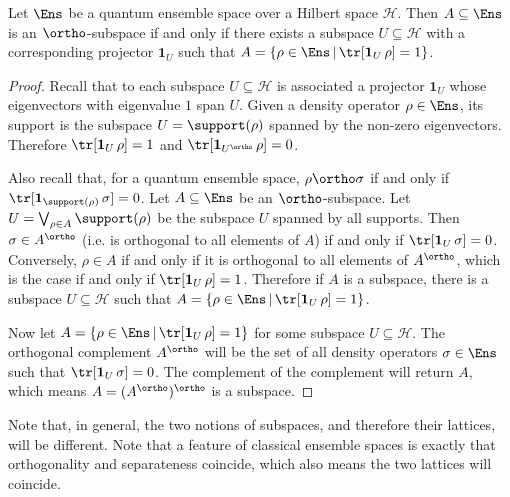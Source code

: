 \begin{mathSection}
\begin{prop}
	Let $\Ens$ be a quantum ensemble space over a Hilbert space $\mathcal{H}$. Then $A \subseteq \Ens$ is an $\ortho$-subspace if and only if there exists a subspace $U \subseteq \mathcal{H}$ with a corresponding projector $\mathbf{1}_{U}$ such that $A = \{ \rho \in \Ens \, | \, \tr[\mathbf{1}_{U} \, \rho] = 1\}$. 
\end{prop}

\begin{proof}
	Recall that to each subspace $U \subseteq \mathcal{H}$ is associated a projector $\mathbf{1}_U$ whose eigenvectors with eigenvalue $1$ span $U$. Given a density operator $\rho \in \Ens$, its support is the subspace $U=\support(\rho)$ spanned by the non-zero eigenvectors. Therefore $\tr[\mathbf{1}_{U} \, \rho] = 1$ and $\tr[\mathbf{1}_{U^{\ortho}} \, \rho] = 0$.

	Also recall that, for a quantum ensemble space, $\rho \ortho \sigma$ if and only if $\tr[ \mathbf{1}_{\support(\rho)} \, \sigma] = 0$. Let $A \subseteq \Ens$ be an $\ortho$-subspace. Let $U = \bigvee_{\rho \in A} \support(\rho)$ be the subspace $U$ spanned by all supports. Then $\sigma \in A^{\ortho}$  (i.e. is orthogonal to all elements of $A$) if and only if $\tr[\mathbf{1}_{U} \, \sigma] = 0$. Conversely, $\rho \in A$ if and only if it is orthogonal to all elements of $A^{\ortho}$, which is the case if and only if $\tr[\mathbf{1}_{U} \, \rho] = 1$. Therefore if $A$ is a subspace, there is a subspace $U \subseteq \mathcal{H}$ such that $A = \{ \rho \in \Ens \, | \, \tr[\mathbf{1}_{U} \, \rho] = 1\}$.
	
	Now let $A = \{ \rho \in \Ens \, | \, \tr[\mathbf{1}_{U} \, \rho] = 1\}$ for some subspace $U \subseteq \mathcal{H}$. The orthogonal complement $A^{\ortho}$ will be the set of all density operators $\sigma \in \Ens$ such that $\tr[\mathbf{1}_{U} \, \sigma] = 0$. The complement of the complement will return $A$, which means $A = (A^{\ortho})^{\ortho}$ is a subspace.
\end{proof}
\end{mathSection}

Note that, in general, the two notions of subspaces, and therefore their lattices, will be different. Note that a feature of classical ensemble spaces is exactly that orthogonality and separateness coincide, which also means the two lattices will coincide.

